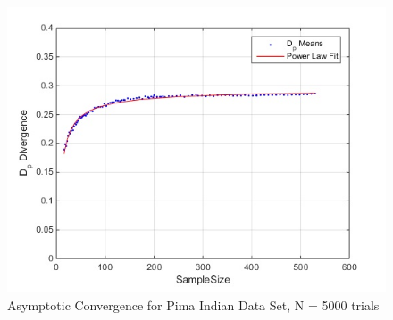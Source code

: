 \documentclass{article}
\begin{document}
		\begin{figure}[h]
			\caption{Asymptotic Convergence for Pima Indian Data Set, N = 5000 trials}
			\centering
			\includegraphics[scale=0.6]{dp_n5000}
		\end{figure}	
		
\end{document}
